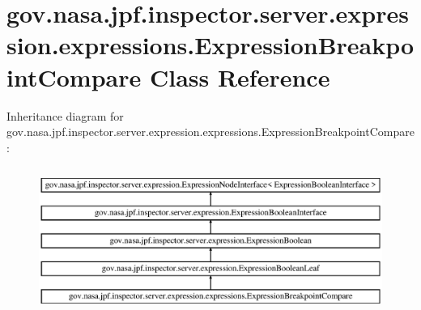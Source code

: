 \hypertarget{classgov_1_1nasa_1_1jpf_1_1inspector_1_1server_1_1expression_1_1expressions_1_1_expression_breakpoint_compare}{}\section{gov.\+nasa.\+jpf.\+inspector.\+server.\+expression.\+expressions.\+Expression\+Breakpoint\+Compare Class Reference}
\label{classgov_1_1nasa_1_1jpf_1_1inspector_1_1server_1_1expression_1_1expressions_1_1_expression_breakpoint_compare}
Inheritance diagram for gov.\+nasa.\+jpf.\+inspector.\+server.\+expression.\+expressions.\+Expression\+Breakpoint\+Compare\+:\begin{figure}[H]
\begin{center}
\leavevmode
\includegraphics[height=4.827586cm]{classgov_1_1nasa_1_1jpf_1_1inspector_1_1server_1_1expression_1_1expressions_1_1_expression_breakpoint_compare}
\end{center}
\end{figure}
